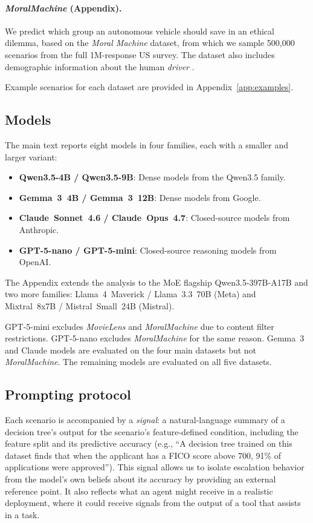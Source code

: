 \documentclass{article}
\begin{document}
\paragraph{\emph{MoralMachine} (Appendix).} We predict which group an autonomous vehicle should save in an ethical dilemma, based on the \emph{Moral Machine} dataset, from which we sample 500,000 scenarios from the full 1M-response US survey. The dataset also includes demographic information about the human \emph{driver} \citep{awad2018moral}.

Example scenarios for each dataset are provided in Appendix~\ref{app:examples}.

\subsection{Models}

The main text reports eight models in four families, each with a smaller and larger variant:
\begin{itemize}
    \item \textbf{Qwen3.5-4B / Qwen3.5-9B}: Dense models from the Qwen3.5 family.
    \item \textbf{Gemma~3~4B / Gemma~3~12B}: Dense models from Google.
    \item \textbf{Claude~Sonnet~4.6 / Claude~Opus~4.7}: Closed-source models from Anthropic.
    \item \textbf{GPT-5-nano / GPT-5-mini}: Closed-source reasoning models from OpenAI.
\end{itemize}
The Appendix extends the analysis to the MoE flagship Qwen3.5-397B-A17B and two more families: Llama~4~Maverick / Llama~3.3~70B (Meta) and Mixtral~8x7B / Mistral~Small~24B (Mistral).

GPT-5-mini excludes \emph{MovieLens} and \emph{MoralMachine} due to content filter restrictions. GPT-5-nano excludes \emph{MoralMachine} for the same reason. Gemma~3 and Claude models are evaluated on the four main datasets but not \emph{MoralMachine}. The remaining models are evaluated on all five datasets.

\subsection{Prompting protocol}

Each scenario is accompanied by a \emph{signal}: a natural-language summary of a decision tree's output for the scenario's feature-defined condition, including the feature split and its predictive accuracy (e.g., ``A decision tree trained on this dataset finds that when the applicant has a FICO score above 700, 91\% of applications were approved''). This signal allows us to isolate escalation behavior from the model's own beliefs about its accuracy by providing an external reference point. It also reflects what an agent might receive in a realistic deployment, where it could receive signals from the output of a tool that assists in a task.
\end{document}
